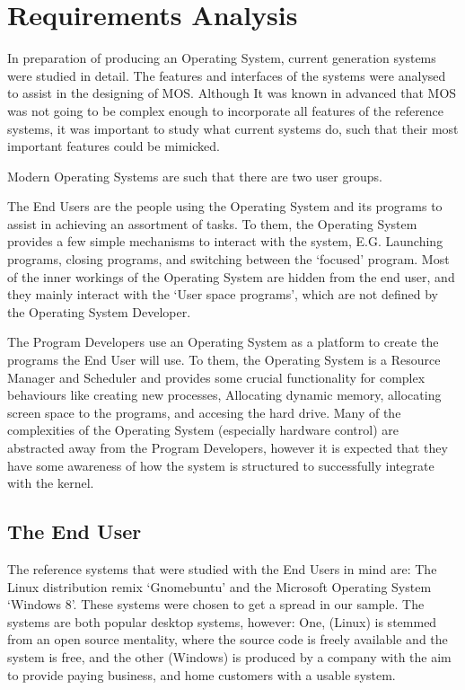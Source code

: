 \documentclass[a4paper]{report}
\begin{document}
\clearpage
\chapter{Requirements Analysis}

In preparation of producing an Operating System, current generation systems were studied in detail. The features and interfaces of the systems were analysed to assist in the designing of MOS. Although It was known in advanced that MOS was not going to be complex enough to incorporate all features of the reference systems, it was important to study what current systems do, such that their most important features could be mimicked.

Modern Operating Systems are such that there are two user groups.


The End Users are the people using the Operating System and its programs to assist in achieving an assortment of tasks. To them, the Operating System provides a few simple mechanisms to interact with the system, E.G. Launching programs, closing programs, and switching between the `focused' program. Most of the inner workings of the Operating System are hidden from the end user, and they mainly interact with the `User space programs', which are not defined by the Operating System Developer.


The Program Developers use an Operating System as a platform to create the programs the End User will use. To them, the Operating System is a Resource Manager and Scheduler and provides some crucial functionality for complex behaviours like creating new processes, Allocating dynamic memory, allocating screen space to the programs, and accesing the hard drive. Many of the complexities of the Operating System (especially hardware control) are abstracted away from the Program Developers, however it is expected that they have some awareness of how the system is structured to successfully integrate with the kernel.






\clearpage
\section{The End User}
The reference systems that were studied with the End Users in mind are: The Linux distribution remix `Gnomebuntu' and the Microsoft Operating System `Windows 8'. These systems were chosen to get a spread in our sample. The systems are both popular desktop systems, however: One, (Linux) is stemmed from an open source mentality, where the source code is freely available and the system is free, and the other (Windows) is produced by a company with the aim to provide paying business, and home customers with a usable system.
\end{document}
